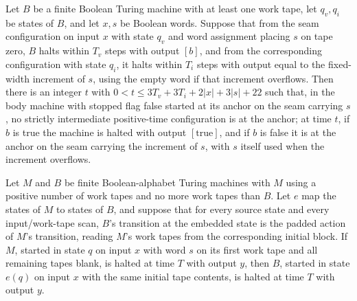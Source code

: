 \begin{lemma}
\label{Complexity.enumCont_body_round_guarded}
\leanok
{}
Let $B$ be a finite Boolean Turing machine with at least one work tape, let $q_v,q_i$ be
states of $B$, and let $x,s$ be Boolean words. Suppose that from the seam configuration
on input $x$ with state $q_v$ and word assignment placing $s$ on tape zero, $B$ halts
within $T_v$ steps with output $[b]$, and from the corresponding configuration with
state $q_i$, it halts within $T_i$ steps with output equal to the fixed-width increment
of $s$, using the empty word if that increment overflows. Then there is an integer $t$
with $0<t\le 3T_v+3T_i+2|x|+3|s|+22$ such that, in the body machine with stopped flag
false started at its anchor on the seam carrying $s$, no strictly intermediate
positive-time configuration is at the anchor; at time $t$, if $b$ is true the machine is
halted with output $[\mathrm{true}]$, and if $b$ is false it is at the anchor on the
seam carrying the increment of $s$, with $s$ itself used when the increment overflows.
\end{lemma}

\begin{lemma}
\label{Complexity.enumCont_lift_call}
\leanok
{}
Let $M$ and $B$ be finite Boolean-alphabet Turing machines with $M$ using a positive
number of work tapes and no more work tapes than $B$. Let $e$ map the states of $M$ to
states of $B$, and suppose that for every source state and every input/work-tape scan,
$B$'s transition at the embedded state is the padded action of $M$'s transition, reading
$M$'s work tapes from the corresponding initial block. If $M$, started in state $q$ on
input $x$ with word $s$ on its first work tape and all remaining tapes blank, is halted
at time $T$ with output $y$, then $B$, started in state $e(q)$ on input $x$ with the
same initial tape contents, is halted at time $T$ with output $y$.
\end{lemma}

